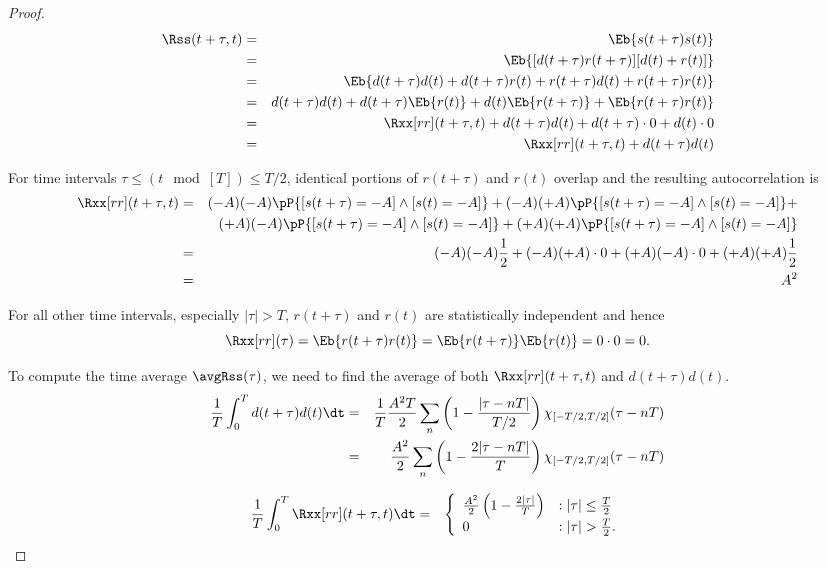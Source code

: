 \begin{proof}
\begin{eqnarray*}
   \Rss(t+\tau,t) 
     &=& \Eb{s(t+\tau)s(t)} 
   \\&=& \Eb{[d(t+\tau)r(t+\tau)][d(t)+r(t)]} 
   \\&=& \Eb{d(t+\tau)d(t) + d(t+\tau)r(t) + r(t+\tau)d(t)+ r(t+\tau)r(t)} 
   \\&=& d(t+\tau)d(t) + d(t+\tau)\Eb{r(t)} + d(t)\Eb{r(t+\tau)}+ \Eb{r(t+\tau)r(t)} 
   \\&=& \Rxx[rr](t+\tau,t) + d(t+\tau)d(t) + d(t+\tau)\cdot0 + d(t)\cdot0 
   \\&=& \Rxx[rr](t+\tau,t) + d(t+\tau)d(t) 
\end{eqnarray*}

For time intervals $\tau \le (t\mod[T])\le T/2$, 
identical portions of $r(t+\tau)$ and $r(t)$
overlap and the resulting autocorrelation is
\begin{eqnarray*}
   \Rxx[rr](t+\tau,t) 
     &=& (-A)(-A)\pP{[s(t+\tau)=-A]\land [s(t)=-A]} + 
         (-A)(+A)\pP{[s(t+\tau)=-A]\land [s(t)=-A]} + \\&&
         (+A)(-A)\pP{[s(t+\tau)=-A]\land [s(t)=-A]} + 
         (+A)(+A)\pP{[s(t+\tau)=-A]\land [s(t)=-A]} 
   \\&=& (-A)(-A)\frac{1}{2} + 
         (-A)(+A)\cdot 0 +
         (+A)(-A)\cdot 0 +
         (+A)(+A)\frac{1}{2} 
   \\&=& A^2
\end{eqnarray*}

For all other time intervals, especially $|\tau|>T$,
$r(t+\tau)$ and $r(t)$ are statistically independent and hence
 \[ \Rxx[rr](\tau) = \Eb{r(t+\tau)r(t)} = \Eb{r(t+\tau)}\Eb{r(t)} = 0\cdot0 = 0.\]


To compute the time average $\avgRss(\tau)$,
we need to find the average of both $\Rxx[rr](t+\tau,t)$ and $d(t+\tau)d(t)$.
\begin{eqnarray*}
   \frac{1}{T}\int_0^T d(t+\tau)d(t) \dt
     &=& \frac{1}{T} \frac{A^2 T}{2} \sum_n \left( 1 - \frac{|\tau-nT|}{T/2} \right)\chi_{[-T/2,T/2]}(\tau-nT)
   \\&=& \frac{A^2}{2} \sum_n \left( 1 - \frac{2|\tau-nT|}{T} \right)\chi_{[-T/2,T/2]}(\tau-nT)
\end{eqnarray*}

\begin{eqnarray*}
   \frac{1}{T}\int_0^T  \Rxx[rr](t+\tau,t) \dt
     &=& \left\{
         \begin{array}{ll}
            \frac{A^2}{2}\left( 1- \frac{2|\tau|}{T}\right) &:|\tau|\le \frac{T}{2} \\
            0 & :|\tau|>\frac{T}{2}.
         \end{array}
         \right.
\end{eqnarray*}


\end{proof}

